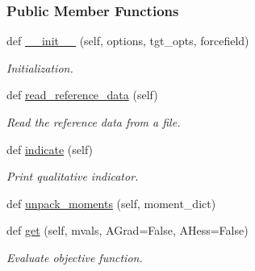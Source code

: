 \subsubsection*{Public Member Functions}
\begin{DoxyCompactItemize}
\item 
def \hyperlink{classsrc_1_1moments_1_1Moments_a19bb50056e254cd95ed28c3665585327}{\+\_\+\+\_\+init\+\_\+\+\_\+} (self, options, tgt\+\_\+opts, forcefield)
\begin{DoxyCompactList}\small\item\em Initialization. \end{DoxyCompactList}\item 
def \hyperlink{classsrc_1_1moments_1_1Moments_a3801c9b06ff63421d27ef6119ead1854}{read\+\_\+reference\+\_\+data} (self)
\begin{DoxyCompactList}\small\item\em Read the reference data from a file. \end{DoxyCompactList}\item 
def \hyperlink{classsrc_1_1moments_1_1Moments_ac12f3ed1e870ec611264267f391752be}{indicate} (self)
\begin{DoxyCompactList}\small\item\em Print qualitative indicator. \end{DoxyCompactList}\item 
def \hyperlink{classsrc_1_1moments_1_1Moments_afedc403680af7392e1b626f40efb4667}{unpack\+\_\+moments} (self, moment\+\_\+dict)
\item 
def \hyperlink{classsrc_1_1moments_1_1Moments_ab922ad13aa4aebf311918e1996555a80}{get} (self, mvals, A\+Grad=False, A\+Hess=False)
\begin{DoxyCompactList}\small\item\em Evaluate objective function. \end{DoxyCompactList}\end{DoxyCompactItemize}
